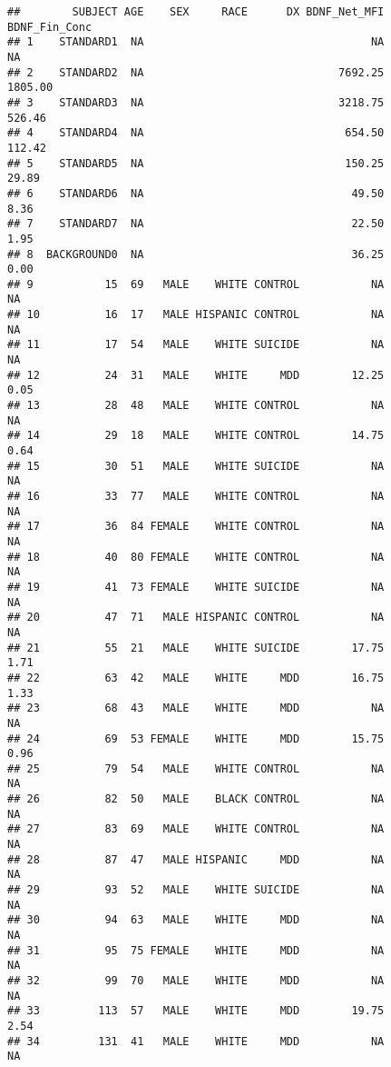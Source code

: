 \documentclass[]{article}
\begin{document}
\begin{verbatim}
##        SUBJECT AGE    SEX     RACE      DX BDNF_Net_MFI BDNF_Fin_Conc
## 1    STANDARD1  NA                                   NA            NA
## 2    STANDARD2  NA                              7692.25       1805.00
## 3    STANDARD3  NA                              3218.75        526.46
## 4    STANDARD4  NA                               654.50        112.42
## 5    STANDARD5  NA                               150.25         29.89
## 6    STANDARD6  NA                                49.50          8.36
## 7    STANDARD7  NA                                22.50          1.95
## 8  BACKGROUND0  NA                                36.25          0.00
## 9           15  69   MALE    WHITE CONTROL           NA            NA
## 10          16  17   MALE HISPANIC CONTROL           NA            NA
## 11          17  54   MALE    WHITE SUICIDE           NA            NA
## 12          24  31   MALE    WHITE     MDD        12.25          0.05
## 13          28  48   MALE    WHITE CONTROL           NA            NA
## 14          29  18   MALE    WHITE CONTROL        14.75          0.64
## 15          30  51   MALE    WHITE SUICIDE           NA            NA
## 16          33  77   MALE    WHITE CONTROL           NA            NA
## 17          36  84 FEMALE    WHITE CONTROL           NA            NA
## 18          40  80 FEMALE    WHITE CONTROL           NA            NA
## 19          41  73 FEMALE    WHITE SUICIDE           NA            NA
## 20          47  71   MALE HISPANIC CONTROL           NA            NA
## 21          55  21   MALE    WHITE SUICIDE        17.75          1.71
## 22          63  42   MALE    WHITE     MDD        16.75          1.33
## 23          68  43   MALE    WHITE     MDD           NA            NA
## 24          69  53 FEMALE    WHITE     MDD        15.75          0.96
## 25          79  54   MALE    WHITE CONTROL           NA            NA
## 26          82  50   MALE    BLACK CONTROL           NA            NA
## 27          83  69   MALE    WHITE CONTROL           NA            NA
## 28          87  47   MALE HISPANIC     MDD           NA            NA
## 29          93  52   MALE    WHITE SUICIDE           NA            NA
## 30          94  63   MALE    WHITE     MDD           NA            NA
## 31          95  75 FEMALE    WHITE     MDD           NA            NA
## 32          99  70   MALE    WHITE     MDD           NA            NA
## 33         113  57   MALE    WHITE     MDD        19.75          2.54
## 34         131  41   MALE    WHITE     MDD           NA            NA

\end{verbatim}
\end{document}
